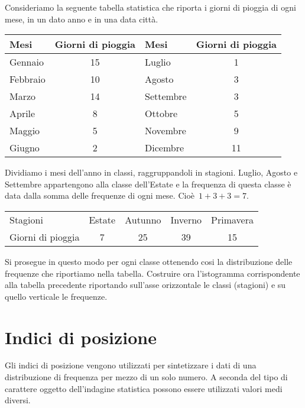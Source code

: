 \begin{esempio}
Consideriamo la seguente tabella statistica che riporta i giorni di pioggia 
di ogni mese, in un dato anno e in una data città.

\begin{center}
\begin{tabular}{lclc}
\toprule
Mesi & Giorni di pioggia &Mesi & Giorni di pioggia\\
\midrule
Gennaio & 15&Luglio & 1 \\
Febbraio & 10 &Agosto & 3\\
Marzo & 14 &Settembre & 3\\
Aprile & 8 &Ottobre & 5\\
Maggio & 5 &Novembre & 9\\
Giugno & 2 &Dicembre & 11\\
\bottomrule
\end{tabular}
\end{center}
Dividiamo i mesi dell'anno in classi, raggruppandoli in stagioni. Luglio, 
Agosto e Settembre
appartengono alla classe dell'Estate e la frequenza di questa classe è data 
dalla somma delle frequenze di ogni mese.
Cioè~\(1 + 3 + 3 = 7\).
\begin{center}
\begin{tabular}{lcccc}
\toprule
Stagioni & Estate & Autunno & Inverno& Primavera\\
Giorni di pioggia & 7 & 25 & 39 & 15 \\
\bottomrule
\end{tabular}
\end{center}
Si prosegue in questo modo per ogni classe ottenendo cosi la distribuzione 
delle frequenze che riportiamo nella tabella.
Costruire ora l'istogramma corrispondente alla tabella precedente 
riportando sull'asse orizzontale le classi (stagioni) e su quello verticale 
le frequenze.
 \end{esempio}


\section{Indici di posizione}
\label{sec:A_medie}

Gli indici di posizione vengono utilizzati per sintetizzare i dati di una 
distribuzione di frequenza per mezzo di un solo numero.
A seconda del tipo di carattere oggetto dell'indagine statistica possono 
essere utilizzati valori medi diversi.

